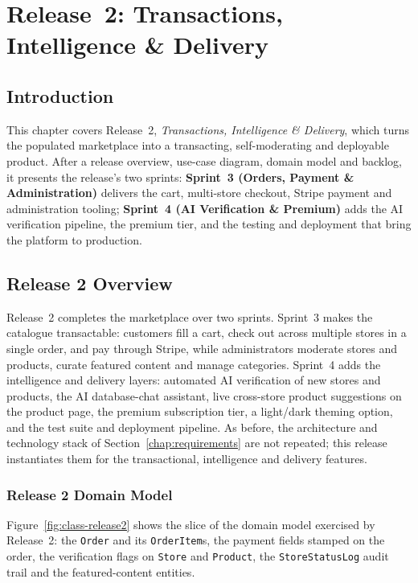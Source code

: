 \chapter{Release~2: Transactions, Intelligence \& Delivery}
\label{chap:release2}

\section*{Introduction}

This chapter covers Release~2, \textit{Transactions, Intelligence \&
Delivery}, which turns the populated marketplace into a transacting,
self-moderating and deployable product. After a release overview,
use-case diagram, domain model and backlog, it presents the release's
two sprints: \textbf{Sprint~3 (Orders, Payment \& Administration)}
delivers the cart, multi-store checkout, Stripe payment and
administration tooling; \textbf{Sprint~4 (AI Verification \& Premium)}
adds the AI verification pipeline, the premium tier, and the testing and
deployment that bring the platform to production.

\section{Release 2 Overview}

Release~2 completes the marketplace over two sprints. Sprint~3 makes the
catalogue transactable: customers fill a cart, check out across multiple
stores in a single order, and pay through Stripe, while administrators
moderate stores and products, curate featured content and manage
categories. Sprint~4 adds the intelligence and delivery layers: automated
AI verification of new stores and products, the AI database-chat
assistant, live cross-store product suggestions on the product page, the
premium subscription tier, a light/dark theming option, and the test suite
and deployment pipeline. As before, the architecture and technology stack of
Section~\ref{chap:requirements} are not repeated; this release
instantiates them for the transactional, intelligence and delivery
features.

\subsection{Release 2 Domain Model}

Figure~\ref{fig:class-release2} shows the slice of the domain model
exercised by Release~2: the \texttt{Order} and its \texttt{OrderItem}s,
the payment fields stamped on the order, the verification flags on
\texttt{Store} and \texttt{Product}, the \texttt{StoreStatusLog} audit
trail and the featured-content entities.

